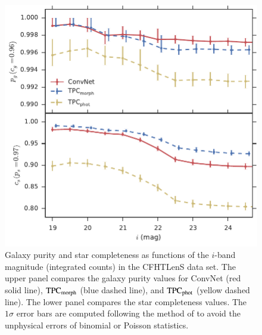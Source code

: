 \documentclass[fleqn,usenatbib]{mnras}
\begin{document}
\begin{figure}
  \centering
  \includegraphics[width=\columnwidth]{figures/clens_integrated.pdf}
  \caption{
    Galaxy purity and star completeness as functions of the $i$-band
    magnitude (integrated counts) in the CFHTLenS data set.
    The upper panel compares the galaxy
    purity values for ConvNet (red solid line), ${\mathrm{TPC}}_{{\mathrm{morph}}}$
    (blue dashed line), and ${\mathrm{TPC}}_{{\mathrm{phot}}}$ (yellow dashed line).
    The lower panel compares the star completeness values.
    The $1 \sigma$ error bars are computed following the method
    of \citet{paterno2004calculating} to avoid the unphysical
    errors of binomial or Poisson statistics.
    }
  \label{fig:clens_integrated}
\end{figure}
\end{document}
